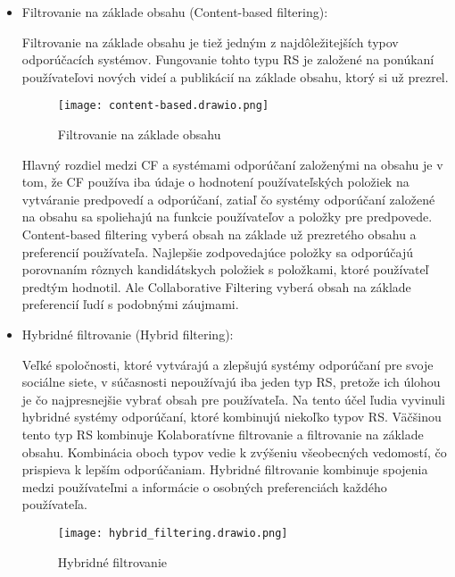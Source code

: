 \documentclass[10pt,twoside,slovak,a4paper]{article}
\begin{document}
\begin{itemize}
\item Filtrovanie na základe obsahu (Content-based filtering):

Filtrovanie na základe obsahu je tiež jedným z najdôležitejších typov odporúčacích systémov. Fungovanie tohto typu RS je založené na ponúkaní používateľovi nových videí a publikácií na základe obsahu, ktorý si už prezrel.


\begin{figure}[h]
    \centering
    \texttt{[image: content-based.drawio.png]}
    \caption{Filtrovanie na základe obsahu}
    \label{fig:content-based}
\end{figure}


Hlavný rozdiel medzi CF a systémami odporúčaní založenými na obsahu je v tom, že CF používa iba údaje o hodnotení používateľských položiek na vytváranie predpovedí a odporúčaní, zatiaľ čo systémy odporúčaní založené na obsahu sa spoliehajú na funkcie používateľov a položky pre predpovede\cite{survey_cf05}. Content-based filtering vyberá obsah na základe už prezretého obsahu a preferencií používateľa. Najlepšie zodpovedajúce položky sa odporúčajú porovnaním rôznych kandidátskych položiek s položkami, ktoré používateľ predtým hodnotil\cite{thorat_cont-b07}. Ale Collaborative Filtering vyberá obsah na základe preferencií ľudí s podobnými záujmami.


\item Hybridné filtrovanie (Hybrid filtering):

Veľké spoločnosti, ktoré vytvárajú a zlepšujú systémy odporúčaní pre svoje sociálne siete, v súčasnosti nepoužívajú iba jeden typ RS, pretože ich úlohou je čo najpresnejšie vybrať obsah pre používateľa. Na tento účel ľudia vyvinuli hybridné systémy odporúčaní, ktoré kombinujú niekoľko typov RS. Väčšinou tento typ RS kombinuje Kolaboratívne filtrovanie a filtrovanie na základe obsahu. Kombinácia oboch typov vedie k zvýšeniu všeobecných vedomostí, čo prispieva k lepším odporúčaniam\cite{geetha_hybrid09}. Hybridné filtrovanie kombinuje spojenia medzi používateľmi a informácie o osobných preferenciách každého používateľa.


\begin{figure}[h]
    \centering
    \texttt{[image: hybrid\_filtering.drawio.png]}
    \caption{Hybridné filtrovanie}
    \label{fig:hybrid-filtering}
\end{figure}




\end{itemize}
\end{document}
